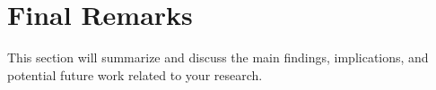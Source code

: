 \documentclass[../thesis.tex]{subfiles}
\begin{document}
	\newpage
	
	\section{Final Remarks}

	This section will summarize and discuss the main findings, implications, and potential future work related to your research.	
\end{document}
